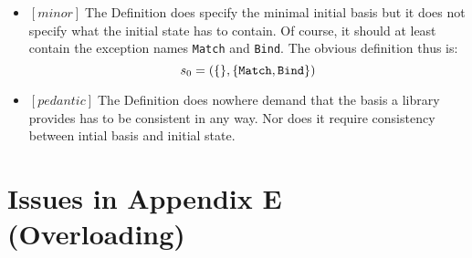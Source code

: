 \documentclass{article}
\newcommand{\m}[1]{$[\mathit{#1}]\;$}
\newcommand{\minor}{\m{minor}}
\newcommand{\pedantic}{\m{pedantic}}
\begin{document}
\begin{itemize}
\item \minor The Definition does specify the minimal initial basis but it does not specify what the initial state has to contain. Of course, it should at least contain the exception names {\tt Match} and {\tt Bind}. The obvious definition thus is:
\begin{displaymath}
s_0 = (\{\}, \{{\tt Match}, {\tt Bind}\})
\end{displaymath}

\item \pedantic The Definition does nowhere demand that the basis a library provides has to be consistent in any way. Nor does it require consistency between intial basis and initial state.
\end{itemize}


\section{Issues in Appendix E (Overloading)}
\label{bugsappendixe}
\end{document}
